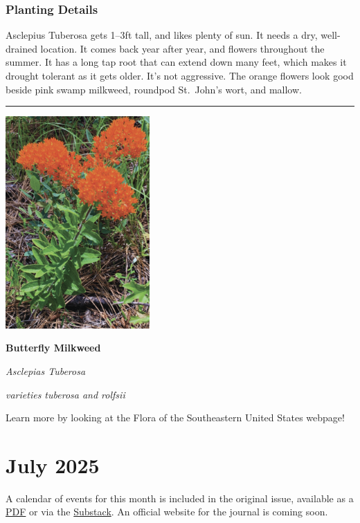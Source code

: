 \documentclass[
]{book}
\begin{document}
\subsection*{Planting Details}\label{planting-details}

Asclepius Tuberosa gets 1--3ft tall, and likes plenty of sun. It needs a dry, well-drained location. It comes back year after year, and flowers throughout the summer. It has a long tap root that can extend down many feet, which makes it drought tolerant as it gets older. It's not aggressive. The orange flowers look good beside pink swamp milkweed, roundpod St.~John's wort, and mallow.

\begin{center}\rule{0.5\linewidth}{0.5pt}\end{center}

\includegraphics[width=2.16667in,height=\textheight,keepaspectratio]{milkweed.png}

\textbf{Butterfly Milkweed}

\emph{Asclepias Tuberosa}

\emph{varieties tuberosa and rolfsii}

Learn more by looking at the Flora of the Southeastern United States webpage!

\chapter*{July 2025}\label{july-2025}

A calendar of events for this month is included in the original issue, available as a \href{https://mobilebaydsa.org/newsletter/july2025.pdf}{PDF} or via the \href{https://viktorzaltys.substack.com/p/mobile-bay-labor-journal-989}{Substack}. An official website for the journal is coming soon.
\end{document}
